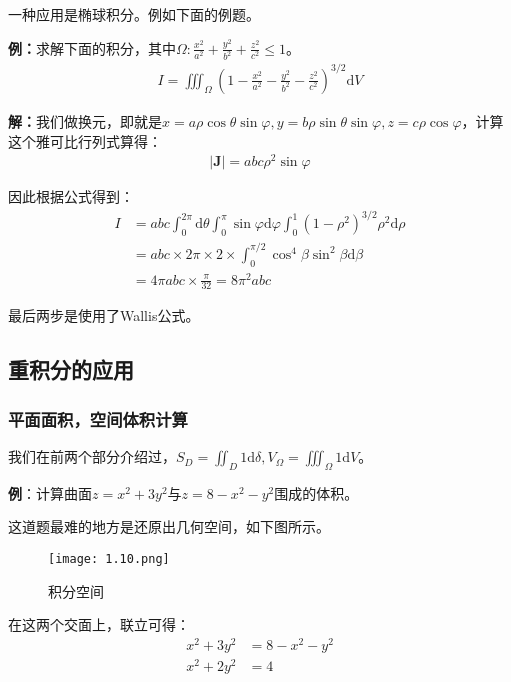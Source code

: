 \documentclass{ctexart}
\let\oldtextbf\textbf
\renewcommand{\textbf}[1]{\textcolor{brown!50!red}{\oldtextbf{#1}}}
\begin{document}
一种应用是椭球积分。例如下面的例题。

\textbf{例：}求解下面的积分，其中$\Omega: \frac{x^2}{a^2}+\frac{y^2}{b^2}+\frac{z^2}{c^2}\leq 1$。
\begin{align*}
    I=\iiint_\Omega (1-\frac{x^2}{a^2}-\frac{y^2}{b^2}-\frac{z^2}{c^2})^{3/2}\mathrm{d}V
\end{align*}

\textbf{解：}我们做换元，即就是$x=a\rho\cos\theta\sin\varphi,y=b\rho\sin\theta\sin\varphi,z=c\rho\cos\varphi$，计算这个雅可比行列式算得：
\begin{align*}
    |\bm{J} |=abc\rho^2\sin\varphi\tag{1-17}
\end{align*}

因此根据公式得到：
\begin{align*}  
I&=abc\int_0^{2\pi}\mathrm{d}\theta\int_0^\pi\sin\varphi\mathrm{d}
\varphi\int_0^1(1-\rho^2)^{3/2}\rho^2\mathrm{d}\rho\\
&=abc\times2\pi\times 2\times \int_0^{\pi/2}\cos^4\beta\sin^2\beta\mathrm{d} \beta \\
&=4\pi abc\times\frac{\pi}{32}=8\pi^2 abc
\end{align*}

最后两步是使用了Wallis公式。

\subsection{重积分的应用}
\subsubsection{平面面积，空间体积计算}
我们在前两个部分介绍过，$S_D=\iint_D1\mathrm{d}\delta,V_\Omega=\iiint_\Omega 1\mathrm{d}V$。

\textbf{\color{brown!50!red}例}：计算曲面$z=x^2+3y^2$与$z=8-x^2-y^2$围成的体积。

这道题最难的地方是还原出几何空间，如下图所示。
\begin{figure}[H]    
\centering     
\renewcommand{\figurename}{图}     
\renewcommand{\thefigure}{1.10}    
\begin{myimagebox}[width=0.5\textwidth] %
\texttt{[image: 1.10.png]} %
\end{myimagebox}     
\caption{\label{fig:1.10}积分空间}   
\end{figure}

在这两个交面上，联立可得：
\begin{align*}
    x^2+3y^2&=8-x^2-y^2\\
    x^2+2y^2&=4
\end{align*}
\end{document}
